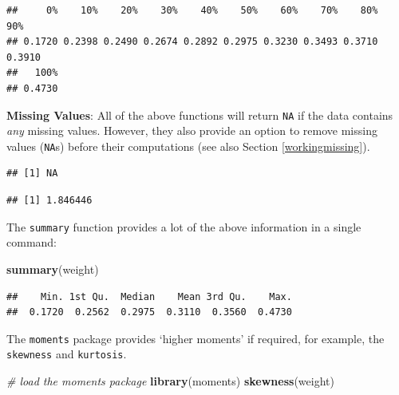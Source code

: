 \documentclass[]{book}
\newenvironment{Shaded}{\begin{snugshade}}{\end{snugshade}}
\newcommand{\CommentTok}[1]{\textcolor[rgb]{0.56,0.35,0.01}{\textit{#1}}}
\newcommand{\DataTypeTok}[1]{\textcolor[rgb]{0.13,0.29,0.53}{#1}}
\newcommand{\KeywordTok}[1]{\textcolor[rgb]{0.13,0.29,0.53}{\textbf{#1}}}
\newcommand{\NormalTok}[1]{#1}
\newcommand{\OperatorTok}[1]{\textcolor[rgb]{0.81,0.36,0.00}{\textbf{#1}}}
\newcommand{\OtherTok}[1]{\textcolor[rgb]{0.56,0.35,0.01}{#1}}
\begin{document}
\begin{verbatim}
##     0%    10%    20%    30%    40%    50%    60%    70%    80%    90% 
## 0.1720 0.2398 0.2490 0.2674 0.2892 0.2975 0.3230 0.3493 0.3710 0.3910 
##   100% 
## 0.4730
\end{verbatim}

\textbf{Missing Values}: All of the above functions will return \texttt{NA} if the data contains \emph{any} missing values. However, they also provide an option to remove missing values (\texttt{NA}s) before their computations (see also Section \ref{workingmissing}).

\begin{Shaded}
\end{Shaded}

\begin{verbatim}
## [1] NA
\end{verbatim}

\begin{Shaded}
\end{Shaded}

\begin{verbatim}
## [1] 1.846446
\end{verbatim}

The \texttt{summary} function provides a lot of the above information in a single command:

\begin{Shaded}
\begin{Highlighting}[]
\KeywordTok{summary}\NormalTok{(weight)}
\end{Highlighting}
\end{Shaded}

\begin{verbatim}
##    Min. 1st Qu.  Median    Mean 3rd Qu.    Max. 
##  0.1720  0.2562  0.2975  0.3110  0.3560  0.4730
\end{verbatim}

The \texttt{moments} package provides `higher moments' if required, for example,
the \texttt{skewness} and \texttt{kurtosis}.

\begin{Shaded}
\begin{Highlighting}[]
\CommentTok{# load the moments package}
\KeywordTok{library}\NormalTok{(moments)}
\KeywordTok{skewness}\NormalTok{(weight)}
\end{Highlighting}
\end{Shaded}
\end{document}
